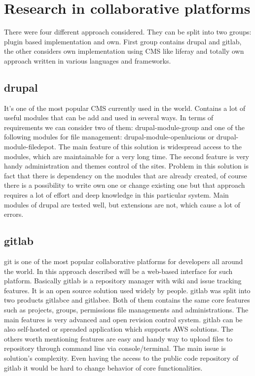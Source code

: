\section{Research in collaborative platforms} \label{s:introduction:research-in-collaborative-platforms}
	There were four different approach considered. They can be split into two groups: plugin based implementation and own. First group contains \gls{drupal} and \gls{gitlab}, the other considers own implementation using \gls{CMS} like \gls{liferay} and totally own approach written in various languages and frameworks.
	
	\subsection{\gls{drupal}}
		It's one of the most popular \gls{CMS} currently used in the world. Contains a lot of useful modules that can be add and used in several ways. In terms of requirements we can consider two of them: \gls{drupal-module-group} and one of the following modules for file management:
		\gls{drupal-module-openlucious} or \gls{drupal-module-filedepot}. The main feature of this solution is widespread access to the modules, which are maintainable for a very long time. The second feature is very handy administration and themes control of the sites. Problem in this solution is fact that there is dependency on the modules that are already created, of course there is a possibility to write own one or change existing one but that approach requires a lot of effort and deep knowledge in this particular system. Main modules of \gls{drupal} are tested well, but extensions are not, which cause a lot of errors. 
	
	\subsection{\gls{gitlab}}
		\gls{git} is one of the most popular collaborative platforms for developers all around the world. In this approach described will be a web-based interface for such platform. Basically \gls{gitlab} is a repository manager with wiki and issue tracking features. It is an open source solution used widely by people. \gls{gitlab} was split into two products \gls{gitlabce} and \gls{gitlabee}. Both of them contains the same core features such as projects, groups, permissions file managements and administrations. The main features is very advanced and open revision control system. \gls{gitlab} can be also self-hosted or spreaded application which supports \gls{AWS} solutions. The others worth mentioning features are easy and handy way to upload files to repository through command line via console/terminal. The main issue is solution's complexity. Even having the access to the public code repository of \gls{gitlab} it would be hard to change behavior of core functionalities. 
